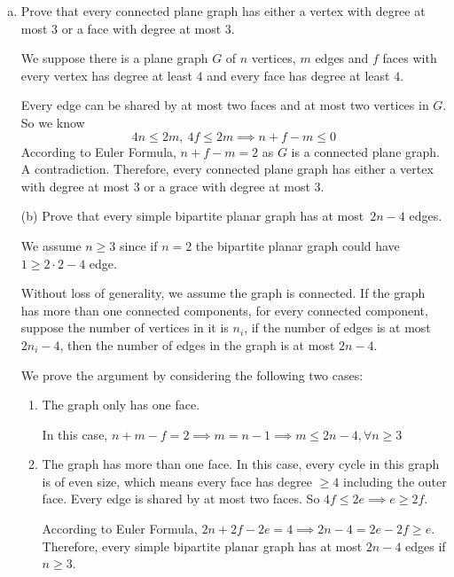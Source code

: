 \documentclass[11pt]{article}
\begin{document}
\begin{enumerate}[(a)]\itemsep0pt
  \item
    Prove that every connected plane graph has either a vertex with degree at most \(3\) or a face
    with degree at most \(3\).

\begin{solution}
  We suppose there is a plane graph \(G\) of \(n\) vertices, \(m\) edges and \(f\) faces with every vertex has degree at least \(4\) and every face has degree at least \(4\).

  Every edge can be shared by at most two faces and at most two vertices in \(G\). So we know
  \[4n\le 2m,\:4f\le 2m\implies n+f-m\le 0\]
  According to Euler Formula, \(n+f-m=2\) as \(G\) is a connected plane graph. A contradiction. Therefore, every connected plane graph has either a vertex with degree at most \(3\) or a grace with degree at most \(3\).
\end{solution}

  \item[(b)]
    Prove that every simple bipartite planar graph has at most~\(2n - 4\) edges.

\begin{solution}
  We assume \(n\ge 3\) since if \(n=2\) the bipartite planar graph could have \(1\ge 2\cdot 2-4\) edge.

  Without loss of generality, we assume the graph is connected.
  If the graph has more than one connected components, for every connected component, suppose the number of vertices in it is \(n_i\), if the number of edges is at most \(2n_i-4\), then the number of edges in the graph is at most \(2n-4\).

  We prove the argument by considering the following two cases:
  \begin{enumerate}[1)]\itemsep0pt
  \item The graph only has one face.

    In this case, \(n+m-f=2\implies m=n-1\implies m\le 2n-4, \forall n\ge 3\)
  \item The graph has more than one face.
    In this case, every cycle in this graph is of even size, which means every face has degree \(\ge 4\) including the outer face.
    Every edge is shared by at most two faces.
    So \(4f\le 2e\implies e\ge 2f\).

    According to Euler Formula, \(2n+2f-2e=4\implies 2n-4=2e-2f\ge e\).
    Therefore, every simple bipartite planar graph has at most \(2n-4\) edges if \(n\ge 3\).
  \end{enumerate}
\end{solution}
\end{enumerate}
\end{document}
